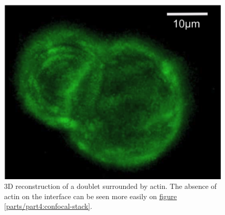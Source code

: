 \documentclass[A4paperpaper,11pt,english]{sphinxmanual}
\begin{document}
\begin{figure}[htbp]
\centering
\capstart

\includegraphics[width=0.500\linewidth]{Fig_03-A.png}
\caption{3D reconstruction of a doublet surrounded by actin. The absence of actin on
the interface can be seen more easily on \hyperref[parts/part4:confocal-stack]{figure  \ref*{parts/part4:confocal-stack}}.}\label{parts/part4:fig3a}\end{figure}
\end{document}
